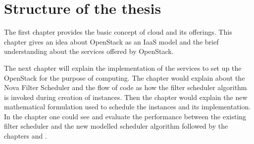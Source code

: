 \section{Structure of the thesis}\label{sec:thesisstructure}
The first chapter  provides the basic concept of cloud and its offerings. This chapter  gives an idea about OpenStack as an IaaS model and the brief understanding about the services offered by OpenStack.

The next chapter  will explain the implementation of the services to set up the OpenStack for the purpose of computing.
The chapter  would explain about the Nova Filter Scheduler and the flow of code as how the filter scheduler algorithm is invoked during creation of instances.
Then the chapter  would explain the new mathematical formulation used to schedule the instances and its implementation.
In the chapter  one could see and evaluate the performance between the existing filter scheduler and the new modelled scheduler algorithm followed by the chapters  and .



